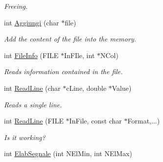 \begin{DoxyCompactItemize}
\begin{DoxyCompactList}\small\item\em Freeing. \end{DoxyCompactList}\item 
int \hyperlink{classVarDatFile_acd5ad8eb7d2e19f9341bbd969b8781f4}{Aggiungi} (char $\ast$file)\hypertarget{classVarDatFile_acd5ad8eb7d2e19f9341bbd969b8781f4}{}\label{classVarDatFile_acd5ad8eb7d2e19f9341bbd969b8781f4}

\begin{DoxyCompactList}\small\item\em Add the content of the file into the memory. \end{DoxyCompactList}\item 
int \hyperlink{classVarDatFile_a63cfc9d080698099e7831515b4fa7625}{File\+Info} (F\+I\+LE $\ast$In\+F\+Ile, int $\ast$N\+Col)\hypertarget{classVarDatFile_a63cfc9d080698099e7831515b4fa7625}{}\label{classVarDatFile_a63cfc9d080698099e7831515b4fa7625}

\begin{DoxyCompactList}\small\item\em Reads information contained in the file. \end{DoxyCompactList}\item 
int \hyperlink{classVarDatFile_ade68053131c1d1ddd635f526f93e4ff3}{Read\+Line} (char $\ast$c\+Line, double $\ast$Value)\hypertarget{classVarDatFile_ade68053131c1d1ddd635f526f93e4ff3}{}\label{classVarDatFile_ade68053131c1d1ddd635f526f93e4ff3}

\begin{DoxyCompactList}\small\item\em Reads a single line. \end{DoxyCompactList}\item 
int \hyperlink{classVarDatFile_acfb2b7579c38d629e6585e6f60373783}{Read\+Line} (F\+I\+LE $\ast$In\+File, const char $\ast$Format,...)\hypertarget{classVarDatFile_acfb2b7579c38d629e6585e6f60373783}{}\label{classVarDatFile_acfb2b7579c38d629e6585e6f60373783}

\begin{DoxyCompactList}\small\item\em Is it working? \end{DoxyCompactList}\item 
int \hyperlink{classVarDatFile_ab6e65ce9879959397314adb9c1f3d5e6}{Elab\+Segnale} (int N\+El\+Min, int N\+El\+Max)\hypertarget{classVarDatFile_ab6e65ce9879959397314adb9c1f3d5e6}{}\label{classVarDatFile_ab6e65ce9879959397314adb9c1f3d5e6}


\end{DoxyCompactItemize}
